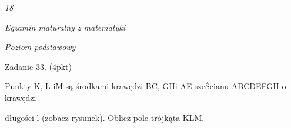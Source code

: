 \documentclass[a4paper,12pt]{article}
\begin{document}
{\it 18}

{\it Egzamin maturalny z matematyki}

{\it Poziom podstawowy}

Zadanie 33. (4pkt)

Punkty K, L iM są środkami krawędzi BC, GHi AE szeŚcianu ABCDEFGH o krawędzi

długości l (zobacz rysunek). Oblicz pole trójkąta KLM.
\end{document}
